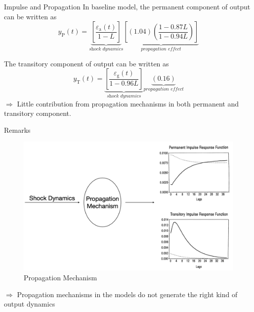 \documentclass[10pt]{beamer}
\begin{document}
\begin{frame}{Impulse and Propagation}
    In baseline model, the permanent component of output can be written as
    $$
        y_{\mathrm{P}}(t)=\underbrace{\left[\frac{\varepsilon_{\mathrm{a}}(t)}{1-L}\right]}_{\textit{shock dynamics}}\underbrace{\left[(1.04)\left(\frac{1-0.87 L}{1-0.94 L}\right)\right]}_{\textit{propagation effect}}
    $$

    The transitory component of output can be written as $$
        y_{\mathrm{T}}(t)=\underbrace{\left[\frac{\varepsilon_{\mathrm{g}}(t)}{1-0.96
                    L}\right]}_{\textit{shock dynamics}}\underbrace{(0.16)}_{\textit{propagation
            effect}} $$ $\Rightarrow$ Little contribution from propagation mechanisms in both permanent and transitory component.

\end{frame}

\begin{frame}{Remarks}
    \begin{figure}
        \centering
        \includegraphics[width=0.8\linewidth]{figures/propagation0.png}
        \caption{Propagation Mechanism}
    \end{figure}

    $\Rightarrow$ Propagation mechanisms in the models do not generate the right kind of output dynamics
\end{frame}
\end{document}

